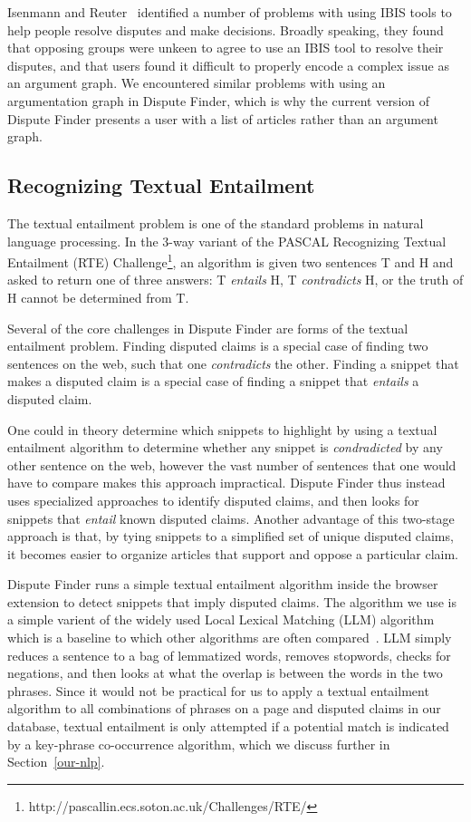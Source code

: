 \documentclass{www2010-submission}
\newcommand{\todo}[1]{}
\begin{document}
Isenmann and Reuter~\cite{Isenmann1997} identified a number of problems with using IBIS tools to help people resolve disputes and make decisions. Broadly speaking, they found that opposing groups were unkeen to agree to use an IBIS tool to resolve their disputes, and that users found it difficult to properly encode a complex issue as an argument graph. We encountered similar problems with using an argumentation graph in Dispute Finder, which is why the current version of Dispute Finder presents a user with a list of articles rather than an argument graph.


\subsection{Recognizing Textual Entailment}
\label{related:entailment}

\todo{Trim this down??}

The textual entailment problem is one of the standard problems in natural language processing. In the 3-way variant of the PASCAL Recognizing Textual Entailment (RTE) Challenge\footnote{http://pascallin.ecs.soton.ac.uk/Challenges/RTE/}, an algorithm is given two sentences T and H and asked to return one of three answers: T {\it entails} H, T {\it contradicts} H, or the truth of H cannot be determined from T. 

Several of the core challenges in Dispute Finder are forms of the textual entailment problem. Finding disputed claims is a special case of finding two sentences on the web, such that one {\it contradicts} the other. Finding a snippet that makes a disputed claim is a special case of finding a snippet that {\it entails} a disputed claim. 

One could in theory determine which snippets to highlight by using a textual entailment algorithm to determine whether any snippet is {\it condradicted} by any other sentence on the web, however the vast number of sentences that one would have to compare makes this approach impractical. Dispute Finder thus instead uses specialized approaches to identify disputed claims, and then looks for snippets that {\it entail} known disputed claims. Another advantage of this two-stage approach is that, by tying snippets to a simplified set of unique disputed claims, it becomes easier to organize articles that support and oppose a particular claim.

Dispute Finder runs a simple textual entailment algorithm inside the browser extension to detect snippets that imply disputed claims. The algorithm we use is a simple varient of the widely used Local Lexical Matching (LLM) algorithm~\cite{Jijkoun2006} which is a baseline to which other algorithms are often compared~\cite{Braz}. LLM simply reduces a sentence to a bag of lemmatized words, removes stopwords, checks for negations, and then looks at what the overlap is between the words in the two phrases. Since it would not be practical for us to apply a textual entailment algorithm to all combinations of phrases on a page and disputed claims in our database, textual entailment is only attempted if a potential match is indicated by a key-phrase co-occurrence algorithm, which we discuss further in Section~\ref{our-nlp}.
\end{document}
